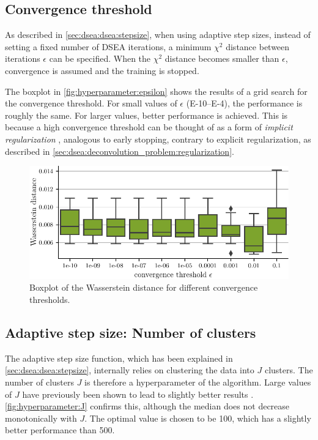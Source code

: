 \subsection{Convergence threshold}
As described in \autoref{sec:dsea:dsea:stepsize}, %
when using adaptive step sizes,
instead of setting a fixed number of DSEA iterations,
a minimum $\chi^2$ distance between iterations $\epsilon$
can be specified.
When the $\chi^2$ distance becomes smaller than $\epsilon$,
convergence is assumed and the training is stopped.

The boxplot in \autoref{fig:hyperparameter:epsilon} shows the results of a grid search for the convergence threshold.
For small values of $\epsilon$
  (\numrange{E-10}{E-4}),
the performance is roughly the same.
%
For larger values, better performance is achieved. %
This is because a high convergence threshold can be thought of as
  a form of \emph{implicit regularization} \citationneeded{},
    analogous to early stopping,
  contrary to explicit regularization,
    as described in \autoref{sec:dsea:deconvolution_problem:regularization}.


\begin{figure}
  \centering
  \includegraphics[width=\textwidth]{content/plots/hyperparam/epsilon_vs_wd_boxplot_lessheight.pdf}
  \caption{Boxplot of the Wasserstein distance for different convergence thresholds.}
  \label{fig:hyperparameter:epsilon}
\end{figure}


\subsection{Adaptive step size: Number of clusters}
The adaptive step size function,
  which has been explained in \autoref{sec:dsea:dsea:stepsize},
internally relies on clustering the data into $J$ clusters.
The number of clusters $J$ is therefore a hyperparameter of the algorithm.
%
Large values of $J$ have previously been shown to lead to slightly better results \cite{dsea_mirko}.
\autoref{fig:hyperparameter:J} confirms this,
although the median does not decrease monotonically with $J$.
The optimal value is chosen to be \num{100},
which has a slightly better performance than \num{500}.

